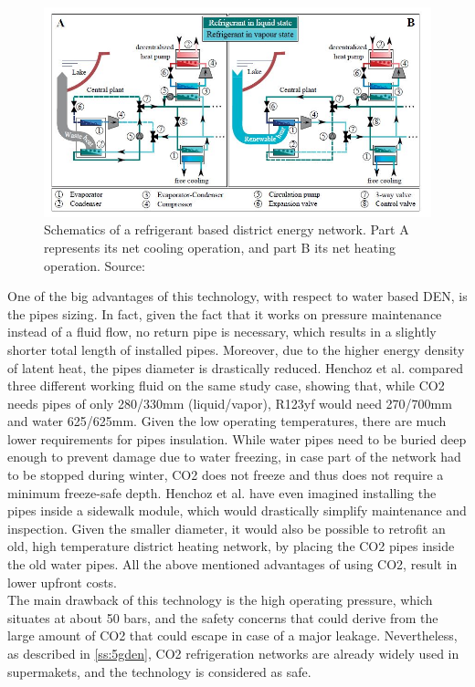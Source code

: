 \documentclass{article}
\begin{document}
\begin{figure}[h!]
\centering
\includegraphics[width=1\textwidth]{CO2schema.JPG}
\caption{Schematics of a refrigerant based district energy network. Part A represents its net cooling operation, and part B its net heating operation. Source: \cite{henchozPotentialRefrigerantBased}}
\label{fig:CO2schema}
\end{figure}

One of the big advantages of this technology, with respect to water based DEN, is the pipes sizing. In fact, given the fact that it works on pressure maintenance instead of a fluid flow, no return pipe is necessary, which results in a slightly shorter total length of installed pipes. Moreover, due to the higher energy density of latent heat, the pipes diameter is drastically reduced. Henchoz et al. \cite{henchozPotentialRefrigerantBased} compared three different working fluid on the same study case, showing that, while CO2 needs pipes of only 280/330mm (liquid/vapor), R123yf would need 270/700mm and water 625/625mm. Given the low operating temperatures, there are much lower requirements for pipes insulation. While water pipes need to be buried deep enough to prevent damage due to water freezing, in case part of the network had to be stopped during winter, CO2 does not freeze and thus does not require a minimum freeze-safe depth. Henchoz et al. have even imagined installing the pipes inside a sidewalk module, which would drastically simplify maintenance and inspection. Given the smaller diameter, it would also be possible to retrofit an old, high temperature district heating network, by placing the CO2 pipes inside the old water pipes. All the above mentioned advantages of using CO2, result in lower upfront costs. \\

The main drawback of this technology is the high operating pressure, which situates at about 50 bars, and the safety concerns that could derive from the large amount of CO2 that could escape in case of a major leakage. Nevertheless, as described in \ref{ss:5gden}, CO2 refrigeration networks are already widely used in supermakets, and the technology is considered as safe. \\
\end{document}
